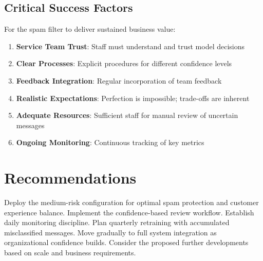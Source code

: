 \documentclass[12pt,a4paper]{article}
\begin{document}
\subsection{Critical Success Factors}

For the spam filter to deliver sustained business value:

\begin{enumerate}
    \item \textbf{Service Team Trust}: Staff must understand and trust model decisions
    \item \textbf{Clear Processes}: Explicit procedures for different confidence levels
    \item \textbf{Feedback Integration}: Regular incorporation of team feedback
    \item \textbf{Realistic Expectations}: Perfection is impossible; trade-offs are inherent
    \item \textbf{Adequate Resources}: Sufficient staff for manual review of uncertain messages
    \item \textbf{Ongoing Monitoring}: Continuous tracking of key metrics
\end{enumerate}

\section{Recommendations}

Deploy the medium-risk configuration for optimal spam protection and customer experience balance. Implement the confidence-based review workflow. Establish daily monitoring discipline. Plan quarterly retraining with accumulated misclassified messages. Move gradually to full system integration as organizational confidence builds. Consider the proposed further developments based on scale and business requirements.
\end{document}
